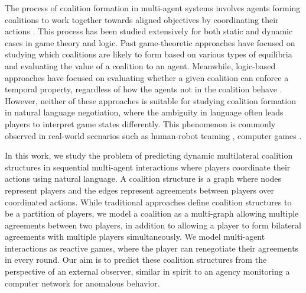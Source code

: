 The process of coalition formation in multi-agent systems involves agents forming coalitions to work together towards aligned objectives by coordinating their actions \citep{sandholm1999coalition,shehory1998methods}. 
This process has been studied extensively for both static and dynamic cases in game theory and logic.  
Past game-theoretic approaches have focused on studying which coalitions are likely to form based on various types of equilibria \citep{hajdukova2006coalition} and evaluating the value of a coalition to an agent. 
Meanwhile, logic-based approaches have focused on evaluating whether a given coalition can enforce a temporal property, regardless of how the agents not in the coalition behave \citep{pauly2002modal,alur2002alternating}.
However, neither of these approaches is suitable for studying coalition formation in natural language negotiation, where the ambiguity in language often leads players to interpret game states differently.
This phenomenon is commonly observed in real-world scenarios such as human-robot teaming \citep{chakraborti2016formal}, computer games \citep{mazrooei2013automating,rodriguez2022collusion}.

%
%

In this work, we study the problem of predicting dynamic multilateral coalition structures in sequential multi-agent interactions where players coordinate their actions using natural language. 
A coalition structure \citep{greenberg1994coalition} is a graph where nodes represent players and the edges represent agreements between players over coordinated actions.
While traditional approaches define coalition structures to be a partition of players, we model a coalition as a multi-graph allowing multiple agreements between two players, in addition to allowing a player to form bilateral agreements with multiple players simultaneously.
We model multi-agent interactions as reactive games, where the player can renegotiate their agreements in every round.  
Our aim is to predict these coalition structures from the perspective of an external observer, similar in spirit to an agency monitoring a computer network for anomalous behavior.


